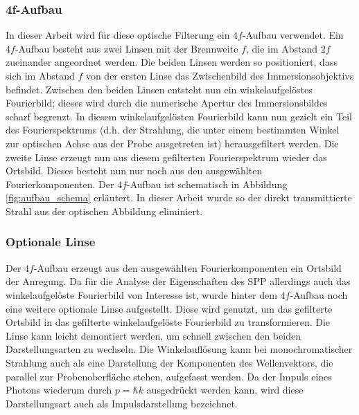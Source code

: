 \documentclass[a4paper, titlepage,  ngerman, fullpage]{book}
\begin{document}
	\subsubsection{4f-Aufbau}
	In dieser Arbeit wird für diese optische Filterung ein $4f$-Aufbau verwendet. Ein $4f$-Aufbau besteht aus zwei Linsen mit der Brennweite $f$, die im Abstand $2f$ zueinander angeordnet werden. Die beiden Linsen werden so positioniert, dass sich im Abstand $f$ von der ersten Linse das Zwischenbild des Immersionsobjektivs befindet. Zwischen den beiden Linsen entsteht nun ein winkelaufgelöstes Fourierbild; dieses wird durch die numerische Apertur des Immersionsbildes scharf begrenzt.  In diesem winkelaufgelösten Fourierbild kann nun gezielt ein Teil des Fourierspektrums (d.h. der Strahlung, die unter einem bestimmten Winkel zur optischen Achse aus der Probe ausgetreten ist) herausgefiltert werden. Die zweite Linse erzeugt nun aus diesem gefilterten Fourierspektrum wieder das Ortsbild. Dieses besteht nun nur noch aus den ausgewählten Fourierkomponenten. Der $4f$-Aufbau ist schematisch in Abbildung \ref{fig:aufbau_schema} erläutert. In dieser Arbeit wurde so der direkt transmittierte Strahl aus der optischen Abbildung eliminiert.
	\subsubsection{Optionale Linse}
	Der $4f$-Aufbau erzeugt aus den ausgewählten Fourierkomponenten ein Ortsbild der Anregung. Da für die Analyse der Eigenschaften des SPP allerdings auch das winkelaufgelöste Fourierbild von Interesse ist, wurde hinter dem $4f$-Aufbau noch eine weitere optionale Linse aufgestellt. Diese wird genutzt, um das gefilterte Ortsbild in das gefilterte winkelaufgelöste Fourierbild zu transformieren. Die Linse kann leicht demontiert werden, um schnell zwischen den beiden Darstellungsarten zu wechseln. Die Winkelauflösung kann bei monochromatischer Strahlung auch als eine Darstellung der Komponenten des Wellenvektors, die parallel zur Probenoberfläche stehen, aufgefasst werden. Da der Impuls eines Photons wiederum durch $p = \hbar k$ ausgedrückt werden kann, wird diese Darstellungsart auch als Impulsdarstellung bezeichnet.
	
\end{document}
